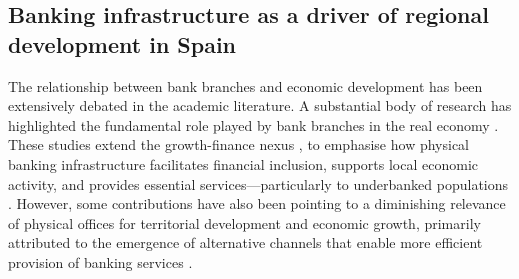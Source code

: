 \documentclass[a4paper,11pt,oneside]{article}
\newcommand{\Emili}{\color{emili}}
\begin{document}




\subsection{Banking infrastructure as a driver of regional development in Spain}
\label{sec:banking_infrastructure}


The relationship between bank branches and economic development has been extensively debated in the academic literature. A substantial body of research has highlighted the fundamental role played by bank branches in the real economy \citep{avery1991deregulation,beck_demirguc_maksimovic_jmcb,solo2006access,anderloni2007access,sarma2011financial,gomez_barroso2013basic}. These studies extend the growth-finance nexus \citep{demirguc.server.2010all}, to emphasise how physical banking infrastructure facilitates financial inclusion, supports local economic activity, and provides essential services---particularly to underbanked populations \citep{jayaratne-strahan-benefits}. However, some contributions have also been pointing to a diminishing relevance of physical offices for territorial development and economic growth, primarily attributed to the emergence of alternative channels that enable more efficient provision of banking services \citep{golubi2019do,demir2020fintech,rossi2021financial}.
\end{document}
